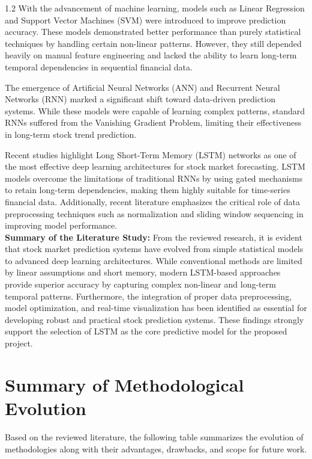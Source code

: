 \documentclass[12pt, a4paper]{report}
\begin{document}
\begin{spacing}{1.2}
With the advancement of machine learning, models such as Linear Regression and Support Vector Machines (SVM) were introduced to improve prediction accuracy. These models demonstrated better performance than purely statistical techniques by handling certain non-linear patterns. However, they still depended heavily on manual feature engineering and lacked the ability to learn long-term temporal dependencies in sequential financial data.

The emergence of Artificial Neural Networks (ANN) and Recurrent Neural Networks (RNN) marked a significant shift toward data-driven prediction systems. While these models were capable of learning complex patterns, standard RNNs suffered from the Vanishing Gradient Problem, limiting their effectiveness in long-term stock trend prediction.

Recent studies highlight Long Short-Term Memory (LSTM) networks as one of the most effective deep learning architectures for stock market forecasting. LSTM models overcome the limitations of traditional RNNs by using gated mechanisms to retain long-term dependencies, making them highly suitable for time-series financial data. Additionally, recent literature emphasizes the critical role of data preprocessing techniques such as normalization and sliding window sequencing in improving model performance.\\

\textbf{Summary of the Literature Study:}  
From the reviewed research, it is evident that stock market prediction systems have evolved from simple statistical models to advanced deep learning architectures. While conventional methods are limited by linear assumptions and short memory, modern LSTM-based approaches provide superior accuracy by capturing complex non-linear and long-term temporal patterns. Furthermore, the integration of proper data preprocessing, model optimization, and real-time visualization has been identified as essential for developing robust and practical stock prediction systems. These findings strongly support the selection of LSTM as the core predictive model for the proposed project.


\section{Summary of Methodological Evolution}
Based on the reviewed literature, the following table summarizes the evolution of methodologies along with their advantages, drawbacks, and scope for future work.


\end{spacing}
\end{document}
